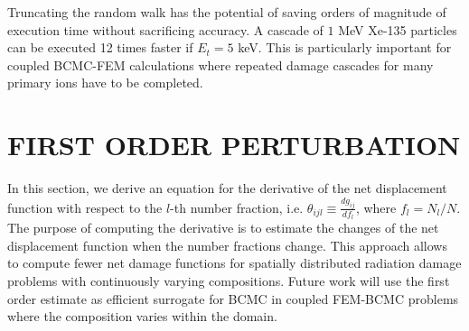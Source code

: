 \documentclass[letterpaper]{mandc2019}
\begin{document}
Truncating the random walk has the potential of saving orders of magnitude of execution time without sacrificing accuracy. A cascade of $1$ MeV Xe-135 particles can be executed 12 times faster if $E_t=5$ keV.
This is particularly important for coupled BCMC-FEM calculations where repeated damage cascades for many primary ions have to be completed.

\section{FIRST ORDER PERTURBATION} \label{sec:perturbation}
In this section, we derive an equation for the derivative of the net displacement function with respect to the $l$-th number fraction, i.e. $\theta_{ijl} \equiv \frac{d g_{ij}}{d f_l}$, where $f_l = N_l / N$. The purpose of computing the derivative is to estimate the changes of the net displacement function when the number fractions change. This approach allows to compute fewer net damage functions for spatially distributed radiation damage problems with continuously varying compositions. Future work will use the first order estimate as efficient surrogate for BCMC in coupled FEM-BCMC problems where the composition varies within the domain. 
\end{document}
